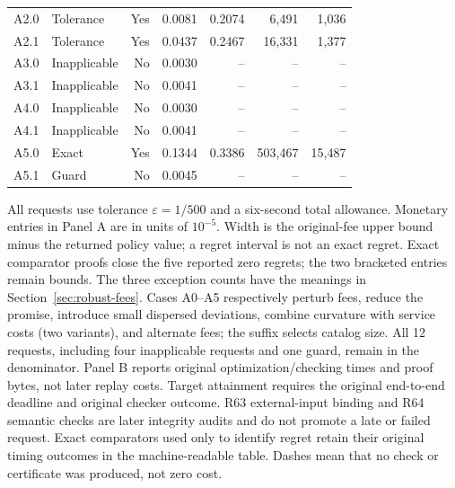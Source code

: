 \begin{table}[p]
\begin{singlespace}
\begin{tabular}{llrrrrr}
A2.0 & Tolerance & Yes & 0.0081 & 0.2074 & 6,491 & 1,036 \\
A2.1 & Tolerance & Yes & 0.0437 & 0.2467 & 16,331 & 1,377 \\
A3.0 & Inapplicable & No & 0.0030 & -- & -- & -- \\
A3.1 & Inapplicable & No & 0.0041 & -- & -- & -- \\
A4.0 & Inapplicable & No & 0.0030 & -- & -- & -- \\
A4.1 & Inapplicable & No & 0.0041 & -- & -- & -- \\
A5.0 & Exact & Yes & 0.1344 & 0.3386 & 503,467 & 15,487 \\
A5.1 & Guard & No & 0.0045 & -- & -- & -- \\
\bottomrule\end{tabular}\par\smallskip
\begin{minipage}{\textwidth}\footnotesize
All requests use tolerance $\varepsilon=1/500$ and a six-second total allowance. Monetary entries in Panel A are in units of $10^{-5}$. Width is the original-fee upper bound minus the returned policy value; a regret interval is not an exact regret. Exact comparator proofs close the five reported zero regrets; the two bracketed entries remain bounds. The three exception counts have the meanings in Section~\ref{sec:robust-fees}. Cases A0--A5 respectively perturb fees, reduce the promise, introduce small dispersed deviations, combine curvature with service costs (two variants), and alternate fees; the suffix selects catalog size. All 12 requests, including four inapplicable requests and one guard, remain in the denominator.
Panel B reports original optimization/checking times and proof bytes, not later replay costs. Target attainment requires the original end-to-end deadline and original checker outcome. R63 external-input binding and R64 semantic checks are later integrity audits and do not promote a late or failed request. Exact comparators used only to identify regret retain their original timing outcomes in the machine-readable table. Dashes mean that no check or certificate was produced, not zero cost.
\end{minipage}\end{singlespace}\end{table}
